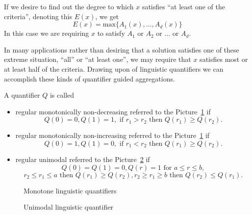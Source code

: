 If we desire to find out the degree to which $x$ satisfies ``at least one of the criteria'', denoting this $E(x)$, we get 
\[E(x) = \text{max}\{A_1(x),\dots,A_d(x)\}\]
In this case we are requiring $x$ to satisfy $A_1$ or $A_2$ or $\dots$  or $A_d$.

In many applications rather than desiring that a solution satisfies one of these extreme situation, ``all'' or ``at least one'', we may require that $x$ satisfies most or at least half of the criteria. Drawing upon \cite{zadeh1984computational} of linguistic quantifiers we can accomplish these kinds of quantifier guided aggregations.

\begin{dfn}
A quantifier $Q$ is called 
\begin{itemize}
\item	regular monotonically non-decreasing referred to the Picture~\ref{pig:owa5} if 
\[Q(0) = 0, Q(1) = 1, \text{  if  } r_1 > r_2 \text{  then  } Q(r_1) \geqslant Q(r_2).\]
\item	regular monotonically non-increasing  referred to the Picture~\ref{pig:owa5} if 
\[Q(0) = 1, Q(1) = 0, \text{  if  } r_1 < r_2 \text{  then  } Q(r_1)\geqslant Q(r_2).\]
\item	regular unimodal referred to the Picture~\ref{pig:owa6} if 
\[Q(0) = Q(1) = 0, Q(r) = 1 \text{  for  } a\leqslant r\leqslant b,\]
\[r_2 \leqslant r_1 \leqslant a \text{  then  } Q(r_1) \geqslant Q(r_2), r_2\geqslant r_1  \geqslant b \text{  then  } Q(r_2) \leqslant Q(r_1).\]
\end{itemize}
\end{dfn}
\begin{figure}[h]
\vspace{.2in}
\caption{Monotone linguistic quantifiers}
\label{pig:owa5}
\end{figure}
\begin{figure}[h]
\vspace{.2in}
\caption{Unimodal linguistic quantifier}
\label{pig:owa6}
\end{figure}

